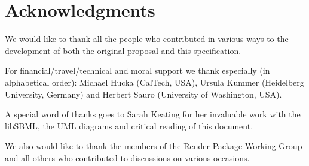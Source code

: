 
\section{Acknowledgments}

We would like to thank all the people who contributed in various ways to the development of both the original proposal and this specification.

For financial/travel/technical and moral support we thank especially (in alphabetical order): Michael Hucka (CalTech, USA), Ursula Kummer (Heidelberg University, Germany) and Herbert Sauro (University of Washington, USA).

A special word of thanks goes to Sarah Keating for her invaluable work with the \textsf{libSBML}, the UML diagrams and critical reading of this document.

We also would like to thank the members of the \textsf{Render Package Working Group} and all others who contributed to discussions on various occasions.

